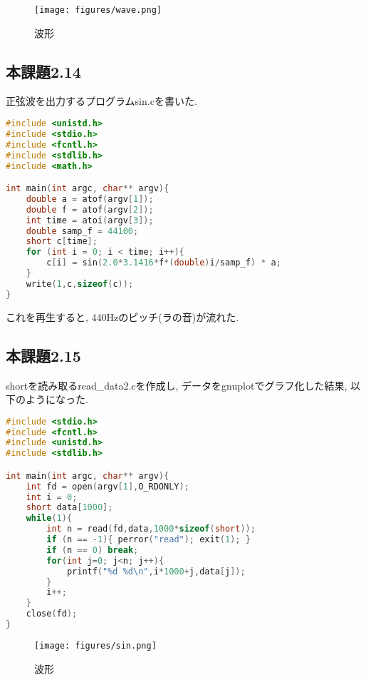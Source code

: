\documentclass{ltjsarticle}
\begin{document}
\begin{figure}[H]
  \begin{center}
    \texttt{[image: figures/wave.png]}
    \caption{波形}
  \end{center}
\end{figure}

\subsection{本課題2.14}
正弦波を出力するプログラムsin.cを書いた. 
\begin{lstlisting}[caption=sin.c,language=C]
#include <unistd.h>
#include <stdio.h>
#include <fcntl.h>
#include <stdlib.h>
#include <math.h>

int main(int argc, char** argv){
    double a = atof(argv[1]);
    double f = atof(argv[2]);
    int time = atoi(argv[3]);
    double samp_f = 44100;
    short c[time];
    for (int i = 0; i < time; i++){
        c[i] = sin(2.0*3.1416*f*(double)i/samp_f) * a;
    }
    write(1,c,sizeof(c));
}
\end{lstlisting}
これを再生すると, 440Hzのピッチ(ラの音)が流れた. 

\subsection{本課題2.15}
shortを読み取るread\_data2.cを作成し, データをgnuplotでグラフ化した結果, 以下のようになった. 
\begin{lstlisting}[caption=read\_data2.c,language=C]
#include <stdio.h>
#include <fcntl.h>
#include <unistd.h>
#include <stdlib.h>

int main(int argc, char** argv){
    int fd = open(argv[1],O_RDONLY);
    int i = 0;
    short data[1000];
    while(1){
        int n = read(fd,data,1000*sizeof(short));
        if (n == -1){ perror("read"); exit(1); }
        if (n == 0) break;
        for(int j=0; j<n; j++){
            printf("%d %d\n",i*1000+j,data[j]);
        }
        i++;
    }
    close(fd);
}
\end{lstlisting}
\begin{figure}[H]
  \begin{center}
    \texttt{[image: figures/sin.png]}
    \caption{波形}
  \end{center}
\end{figure}
\end{document}
